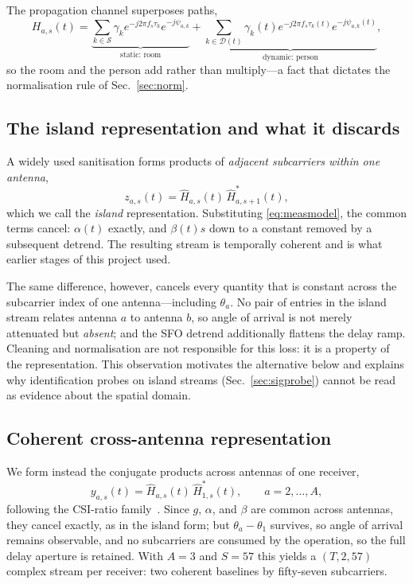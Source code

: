 \documentclass[conference]{IEEEtran}
\begin{document}
The propagation channel superposes paths,
\begin{equation}
H_{a,s}(t) = \underbrace{\textstyle\sum_{k\in\mathcal{S}} \gamma_k
e^{-j2\pi f_s \tau_k} e^{-j\psi_{a,k}}}_{\text{static: room}}
+ \underbrace{\textstyle\sum_{k\in\mathcal{D}(t)} \gamma_k(t)
e^{-j2\pi f_s \tau_k(t)} e^{-j\psi_{a,k}(t)}}_{\text{dynamic: person}},
\label{eq:paths}
\end{equation}
so the room and the person add rather than multiply---a fact that dictates the
normalisation rule of Sec.~\ref{sec:norm}.

\subsection{The island representation and what it discards}
\label{sec:islands}

A widely used sanitisation forms products of \emph{adjacent subcarriers within
one antenna},
\begin{equation}
z_{a,s}(t) = \hat{H}_{a,s}(t)\,\hat{H}^{*}_{a,s+1}(t),
\end{equation}
which we call the \emph{island} representation. Substituting
\eqref{eq:measmodel}, the common terms cancel: $\alpha(t)$ exactly, and
$\beta(t)s$ down to a constant removed by a subsequent detrend. The resulting
stream is temporally coherent and is what earlier stages of this project used.

The same difference, however, cancels every quantity that is constant across
the subcarrier index of one antenna---including $\theta_a$. No pair of entries
in the island stream relates antenna $a$ to antenna $b$, so angle of arrival is
not merely attenuated but \emph{absent}; and the SFO detrend additionally
flattens the delay ramp. Cleaning and normalisation are not responsible for
this loss: it is a property of the representation. This observation motivates
the alternative below and explains why identification probes on island streams
(Sec.~\ref{sec:sigprobe}) cannot be read as evidence about the spatial domain.

\subsection{Coherent cross-antenna representation}

We form instead the conjugate products across antennas of one receiver,
\begin{equation}
y_{a,s}(t) = \hat{H}_{a,s}(t)\,\hat{H}^{*}_{1,s}(t),\qquad a = 2,\dots,A,
\label{eq:coherent}
\end{equation}
following the CSI-ratio family~\cite{li2017indotrack,zeng2019farsense}. Since
$g$, $\alpha$, and $\beta$ are common across antennas, they cancel exactly, as
in the island form; but $\theta_a - \theta_1$ survives, so angle of arrival
remains observable, and no subcarriers are consumed by the operation, so the
full delay aperture is retained. With $A = 3$ and $S = 57$ this yields a
$(T, 2, 57)$ complex stream per receiver: two coherent baselines by
fifty-seven subcarriers.
\end{document}
